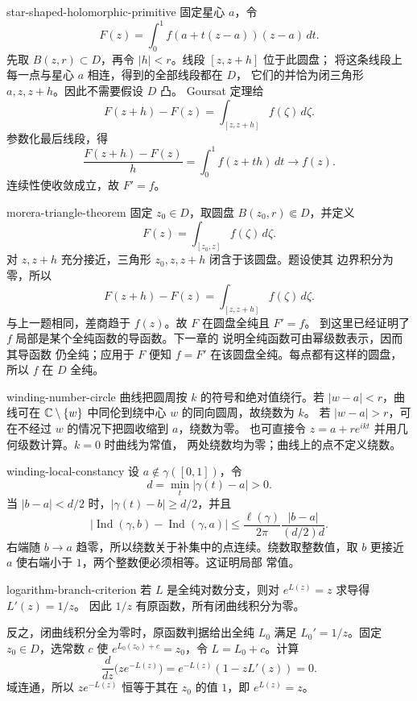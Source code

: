 \begin{solution}{star-shaped-holomorphic-primitive}
固定星心 \(a\)，令
\[
 F(z)=\int_0^1 f(a+t(z-a))(z-a)\,dt.
\]
先取 \(B(z,r)\subset D\)，再令 \(|h|<r\)。线段 \([z,z+h]\) 位于此圆盘；
将这条线段上每一点与星心 \(a\) 相连，得到的全部线段都在 \(D\)，
它们的并恰为闭三角形 \(a,z,z+h\)。因此不需要假设 \(D\) 凸。
Goursat 定理给
\[
 F(z+h)-F(z)=\int_{[z,z+h]}f(\zeta)\,d\zeta.
\]
参数化最后线段，得
\[
 \frac{F(z+h)-F(z)}h=\int_0^1f(z+th)\,dt\to f(z).
\]
连续性使收敛成立，故 \(F'=f\)。
\end{solution}

\begin{solution}{morera-triangle-theorem}
固定 \(z_0\in D\)，取圆盘 \(B(z_0,r)\Subset D\)，并定义
\[
 F(z)=\int_{[z_0,z]}f(\zeta)\,d\zeta.
\]
对 \(z,z+h\) 充分接近，三角形 \(z_0,z,z+h\) 闭含于该圆盘。题设使其
边界积分为零，所以
\[
 F(z+h)-F(z)=\int_{[z,z+h]}f(\zeta)\,d\zeta.
\]
与上一题相同，差商趋于 \(f(z)\)。故 \(F\) 在圆盘全纯且 \(F'=f\)。
到这里已经证明了 \(f\) 局部是某个全纯函数的导函数。下一章的
说明全纯函数可由幂级数表示，因而其导函数
仍全纯；应用于 \(F\) 便知 \(f=F'\) 在该圆盘全纯。每点都有这样的圆盘，
所以 \(f\) 在 \(D\) 全纯。
\end{solution}

\begin{solution}{winding-number-circle}
曲线把圆周按 \(k\) 的符号和绝对值绕行。若 \(|w-a|<r\)，曲线可在
\(\mathbb{C}\setminus\{w\}\) 中同伦到绕中心 \(w\) 的同向圆周，故绕数为 \(k\)。
若 \(|w-a|>r\)，可在不经过 \(w\) 的情况下把圆收缩到 \(a\)，绕数为零。
也可直接令 \(z=a+re^{ikt}\) 并用几何级数计算。\(k=0\) 时曲线为常值，
两处绕数均为零；曲线上的点不定义绕数。
\end{solution}

\begin{solution}{winding-local-constancy}
设 \(a\notin\gamma([0,1])\)，令
\[
 d=\min_t|\gamma(t)-a|>0.
\]
当 \(|b-a|<d/2\) 时，\(|\gamma(t)-b|\ge d/2\)，并且
\[
 \left|\operatorname{Ind}(\gamma,b)-\operatorname{Ind}(\gamma,a)\right|
 \le\frac{\ell(\gamma)}{2\pi}
 \frac{|b-a|}{(d/2)d}.
\]
右端随 \(b\to a\) 趋零，所以绕数关于补集中的点连续。绕数取整数值，取
\(b\) 更接近 \(a\) 使右端小于 \(1\)，两个整数便必须相等。这证明局部
常值。
\end{solution}

\begin{solution}{logarithm-branch-criterion}
若 \(L\) 是全纯对数分支，则对 \(e^{L(z)}=z\) 求导得 \(L'(z)=1/z\)。
因此 \(1/z\) 有原函数，所有闭曲线积分为零。

反之，闭曲线积分全为零时，原函数判据给出全纯 \(L_0\) 满足
\(L_0'=1/z\)。固定 \(z_0\in D\)，选常数 \(c\) 使
\(e^{L_0(z_0)+c}=z_0\)，令 \(L=L_0+c\)。计算
\[
 \frac d{dz}\bigl(ze^{-L(z)}\bigr)
 =e^{-L(z)}(1-zL'(z))=0.
\]
域连通，所以 \(ze^{-L(z)}\) 恒等于其在 \(z_0\) 的值 \(1\)，即
\(e^{L(z)}=z\)。
\end{solution}

